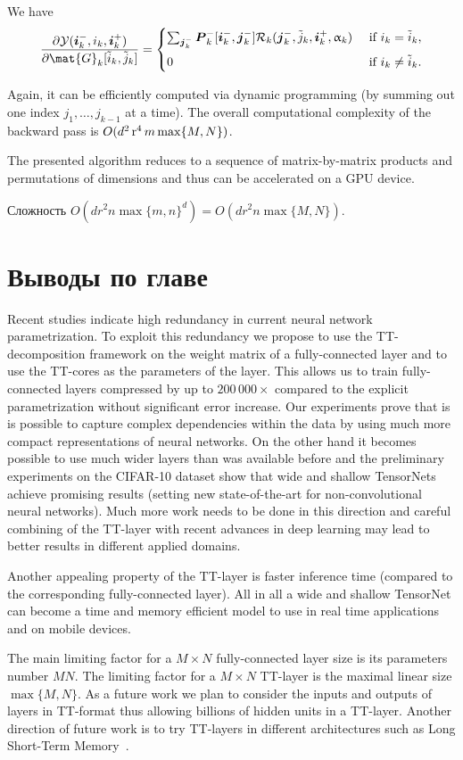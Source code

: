 We have
\begin{align*}
\frac{\partial \tensel{Y}(\vec{i}_k^-, i_k, \vec{i}_k^+)}{\partial \mat{G}_k[\tilde{i}_k, \tilde{j}_k]} =
\begin{cases}
\sum_{\vec{j}_k^-} \vec{P}_k^-[\vec{i}_k^-, \vec{j}_k^-] \tensel{R}_{k}(\vec{j}_{k}^-, \tilde{j}_k, \vec{i}_k^+, \alpha_{k}) & \text{ if } i_k = \tilde{i}_k, \\[0.2cm]
0 & \text{ if } i_k \neq \tilde{i}_k.
\end{cases}
\end{align*}

Again, it can be efficiently computed via dynamic programming (by summing out one index $j_1, \ldots, j_{k-1}$ at a time). The overall computational complexity of the backward pass is $O(d^2 \operatorname{r}^4 m \max\{M, N\})$.

The presented algorithm reduces to a sequence of matrix-by-matrix products and permutations of dimensions and thus can be accelerated on a GPU device.


Сложность $O(d r^2 n \max\{m, n\}^d) = O(d r^2 n \max\{M, N\})$.

\section{Выводы по главе} \label{sec:tensornet-conclusion}
Recent studies indicate high redundancy in current neural network parametrization. To exploit this redundancy we propose to use the TT-decomposition framework on the weight matrix of a fully-connected layer and to use the TT-cores as the parameters of the layer. This allows us to train fully-connected layers compressed by up to $200\,000\times$ compared to the explicit parametrization without significant error increase. Our experiments prove that is is possible to capture complex dependencies within the data by using much more compact representations of neural networks. On the other hand it becomes possible to use much wider layers than was available before and the preliminary experiments on the CIFAR-10 dataset show that wide and shallow TensorNets achieve promising results (setting new state-of-the-art for non-convolutional neural networks). Much more work needs to be done in this direction and careful combining of the TT-layer with recent advances in deep learning may lead to better results in different applied domains.

Another appealing property of the TT-layer is faster inference time (compared to the corresponding fully-connected layer). All in all a wide and shallow TensorNet can become a time and memory efficient model to use in real time applications and on mobile devices.

The main limiting factor for a $M \times N$ fully-connected layer size is its parameters number $MN$. The limiting factor for a $M \times N$ TT-layer is the maximal linear size $\max\{M, N\}$. As a future work we plan to consider the inputs and outputs of layers in TT-format thus allowing billions of hidden units in a TT-layer. Another direction of future work is to try TT-layers in different architectures such as Long Short-Term Memory~\cite{hochreiter1997LSTM}.

